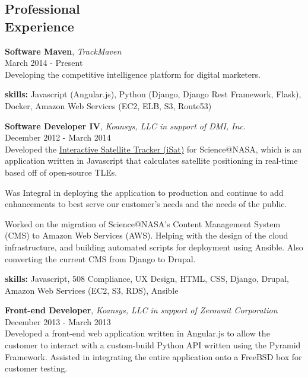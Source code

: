 \documentclass[margin,line,10pt]{resume}
\begin{document}
\begin{resume}
\section{\mysidestyle Professional\\Experience\\\vspace{5pt}}

\textbf{Software Maven}, \textsl{TrackMaven}\\March 2014 - Present\vspace{2mm}\\\vspace{1mm}%
Developing the competitive intelligence platform for digital marketers.

\textbf{skills:} Javascript (Angular.js), Python (Django, Django Rest Framework, Flask), Docker, Amazon Web Services (EC2, ELB, S3, Route53)

\textbf{Software Developer IV}, \textsl{Koansys, LLC in support of DMI, Inc.}\\December 2012 - March 2014\vspace{2mm}\\\vspace{1mm}%
Developed the \href{http://science.nasa.gov/iSat/}{Interactive Satellite Tracker (iSat)} for Science@NASA, which is
an application written in Javascript that calculates satellite positioning in real-time based off of open-source TLEs.

Was Integral in deploying the application to production and continue to add enhancements to best serve our customer's
needs and the needs of the public.

Worked on the migration of Science@NASA's Content Management System (CMS) to Amazon Web Services (AWS). Helping with
the design of the cloud infrastructure, and building automated scripts for deployment using Ansible. Also converting
the current CMS from Django to Drupal.

\textbf{skills:} Javascript, 508 Compliance, UX Design, HTML, CSS, Django, Drupal, Amazon Web Services (EC2, S3, RDS), Ansible

\textbf{Front-end Developer}, \textsl{Koansys, LLC in support of Zerowait Corporation}\\December 2013 - March 2013\vspace{2mm}\\\vspace{1mm}%
Developed a front-end web application written in Angular.js to allow the customer to interact with a custom-build
Python API written using the Pyramid Framework. Assisted in integrating the entire application onto a FreeBSD box
for customer testing.


\end{resume}
\end{document}
